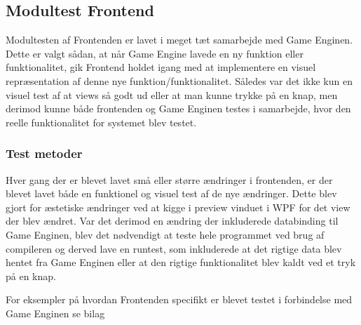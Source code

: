 \subsection{Modultest Frontend}
Modultesten af Frontenden er lavet i meget tæt samarbejde med Game Enginen. Dette er valgt sådan, at når Game Engine lavede en ny funktion eller funktionalitet, gik Frontend holdet igang med at implementere en visuel repræsentation af denne nye funktion/funktionalitet. Således var det ikke kun en visuel test af at views så godt ud eller at man kunne trykke på en knap, men derimod kunne både frontenden og Game Enginen testes i samarbejde, hvor den reelle funktionalitet for systemet blev testet.

\subsubsection{Test metoder}
Hver gang der er blevet lavet små eller større ændringer i frontenden, er der blevet lavet både en funktionel og visuel test af de nye ændringer. Dette blev gjort for æstetiske ændringer ved at kigge i preview vinduet i WPF for det view der blev ændret. Var det derimod en ændring der inkluderede databinding til Game Enginen, blev det nødvendigt at teste hele programmet ved brug af compileren og derved lave en runtest, som inkluderede at det rigtige data blev hentet fra Game Enginen eller at den rigtige funktionalitet blev kaldt ved et tryk på en knap.

\noindent For eksempler på hvordan Frontenden specifikt er blevet testet i forbindelse med Game Enginen se bilag \parencite[][Section 12.1]{TekniskBilag}
